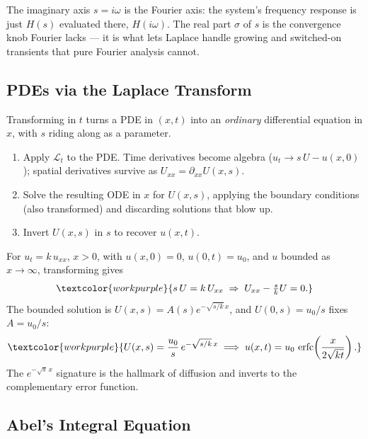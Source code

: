 \begin{conceptbox}
The imaginary axis $s = i\omega$ is the \textcolor{accentorange}{Fourier axis}: the
system's frequency response is just $H(s)$ evaluated there, $H(i\omega)$. The real
part $\sigma$ of $s$ is the convergence knob Fourier lacks --- it is what lets Laplace
handle growing and switched-on transients that pure Fourier analysis cannot.
\end{conceptbox}

\subsection{PDEs via the Laplace Transform}

Transforming in $t$ turns a PDE in $(x,t)$ into an \emph{ordinary} differential
equation in $x$, with $s$ riding along as a parameter.

\begin{methodbox}
\begin{enumerate}
    \item Apply $\mathcal{L}_t$ to the PDE. Time derivatives become algebra
          ($u_t \to s\,U - u(x,0)$); spatial derivatives survive as
          $U_{xx}=\partial_{xx}U(x,s)$.
    \item Solve the resulting ODE in $x$ for $U(x,s)$, applying the boundary
          conditions (also transformed) and discarding solutions that blow up.
    \item Invert $U(x,s)$ in $s$ to recover $u(x,t)$.
\end{enumerate}
\end{methodbox}

\begin{examplebox}
For $u_t = k\,u_{xx}$, $x>0$, with $u(x,0)=0$, $u(0,t)=u_0$, and $u$ bounded as
$x\to\infty$, transforming gives
\[ \textcolor{workpurple}{s\,U = k\,U_{xx} \;\Rightarrow\; U_{xx} - \tfrac{s}{k}U = 0.} \]
The bounded solution is $U(x,s)=A(s)e^{-\sqrt{s/k}\,x}$, and $U(0,s)=u_0/s$ fixes
$A=u_0/s$:
\[ \textcolor{workpurple}{U(x,s) = \frac{u_0}{s}\,e^{-\sqrt{s/k}\,x}
   \;\Longrightarrow\; u(x,t) = u_0\,\operatorname{erfc}\!\left(\frac{x}{2\sqrt{kt}}\right).} \]
The $e^{-\sqrt{s}\,x}$ signature is the hallmark of diffusion and inverts to the
complementary error function.
\end{examplebox}

\subsection{Abel's Integral Equation}

